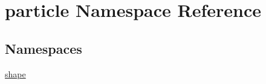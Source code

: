 \hypertarget{namespaceparticle}{}\section{particle Namespace Reference}
\label{namespaceparticle}
\subsection*{Namespaces}
\begin{DoxyCompactItemize}
\item 
 \hyperlink{namespaceparticle_1_1shape}{shape}
\end{DoxyCompactItemize}
